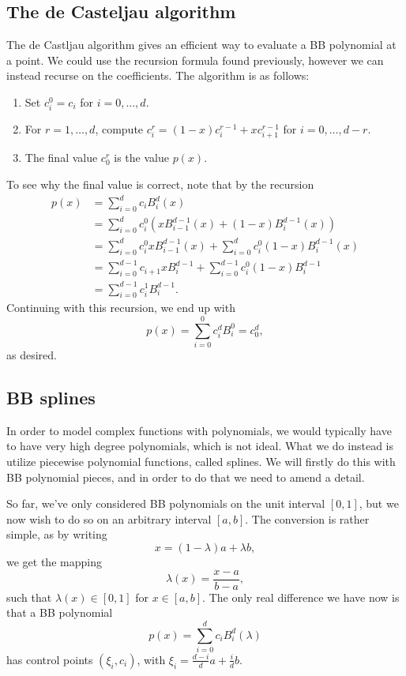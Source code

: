 \subsection{The de Casteljau algorithm}
The de Castljau algorithm gives an efficient way to evaluate a BB polynomial at a point.
We could use the recursion formula found previously, however we can instead recurse on the coefficients.
The algorithm is as follows:
\begin{enumerate}
    \item Set $c_i^0 = c_i$ for $i = 0, \dots, d$.
    \item For $r = 1, \dots, d$, compute $c_i^r = (1 - x)c_i^{r - 1} + x c_{i+1}^{r - 1}$ for $i = 0, \dots, d - r$.
    \item The final value $c_0^r$ is the value $p(x)$.
\end{enumerate}
To see why the final value is correct, note that by the recursion
\begin{align*}
    p(x)
    &= \sum_{i = 0}^{d} c_i B_i^d(x) \\
    &= \sum_{i = 0}^d c_i^0 (x B_{i-1}^{d-1}(x) + (1 - x)B_i^{d - 1}(x)) \\
    &= \sum_{i = 0}^d c_i^0 x B_{i-1}^{d-1}(x) + \sum_{i = 0}^{d} c_i^0 (1 - x)B_i^{d - 1}(x) \\
    &= \sum_{i = 0}^{d - 1} c_{i + 1} x B_{i}^{d - 1} + \sum_{i = 0}^{d - 1} c_i^0 (1 - x) B_i^{d - 1} \\
    &= \sum_{i = 0}^{d - 1} c_i^1 B_i^{d-1}.
\end{align*}
Continuing with this recursion, we end up with
\begin{equation}
    p(x) = \sum_{i = 0}^{0} c_i^d B_i^0 = c_0^d,
\end{equation}
as desired.

\subsection{BB splines}
In order to model complex functions with polynomials, we would typically have to have very high degree polynomials, which is not ideal.
What we do instead is utilize piecewise polynomial functions, called splines.
We will firstly do this with BB polynomial pieces, and in order to do that we need to amend a detail.

So far, we've only considered BB polynomials on the unit interval $[0, 1]$, but we now wish to do so on an arbitrary interval $[a, b]$.
The conversion is rather simple, as by writing
\begin{equation}
    x = (1 - \lambda) a + \lambda b,
\end{equation}
we get the mapping
\begin{equation}
    \lambda(x) = \frac{x - a}{b - a},
\end{equation}
such that $\lambda(x) \in [0, 1]$ for $x \in [a, b]$.
The only real difference we have now is that a BB polynomial
\begin{equation}
    p(x) = \sum_{i = 0}^{d} c_i B_i^d(\lambda)
\end{equation}
has control points $(\xi_i, c_i)$, with $\xi_i = \frac{d - i}{d} a + \frac{i}{d} b$.

